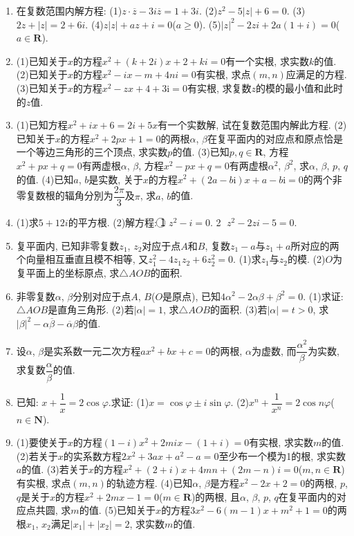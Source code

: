 \documentclass[10pt,a4paper]{article}
\begin{document}
\begin{enumerate}[1.]
\item 在复数范围内解方程:
(1)$z\cdot \overline z-3i\overline z=1+3i$.				(2)$z^2-5|z|+6=0$.
(3)$2z+|z|=2+6i$.					(4)$z|z|+az+i=0$($a\ge 0$).
(5)$|z|^2-2zi+2a(1+i)=0$($a\in \mathbf{R}$).
\item (1)已知关于$x$的方程$x^2+(k+2i)x+2+ki=0$有一个实根, 求实数$k$的值.
(2)已知关于$x$的方程$x^2-ix-m+4ni=0$有实根, 求点$(m,n)$应满足的方程.
(3)已知关于$x$的方程$x^2-zx+4+3\mathrm{i}=0$有实根, 求复数$z$的模的最小值和此时的$z$值.
\item (1)已知方程$x^2+ix+6=2i+5x$有一个实数解, 试在复数范围内解此方程.
(2)已知关于$x$的方程$x^2+2px+1=0$的两根$\alpha$, $\beta$在复平面内的对应点和原点恰是一个等边三角形的三个顶点, 求实数$p$的值.
(3)已知$p,q\in \mathbf{R}$, 方程$x^2+px+q=0$有两虚根$\alpha$, $\beta$, 方程$x^2-px+q=0$有两虚根$\alpha ^2$, $\beta ^2$, 求$\alpha$, $\beta$, $p$, $q$的值.
(4)已知$a$, $b$是实数, 关于$x$的方程$x^2+(2a-b\mathrm{i})x+a-b\mathrm{i}=0$的两个非零复数根的辐角分別为$\dfrac{2\pi }3$及$\pi$, 求$a$, $b$的值.
\item (1)求$5+12i$的平方根.
(2)解方程: \textcircled{1} $z^2-i=0$.				\textcircled{2} $z^2-2zi-5=0$.
\item 复平面内, 已知非零复数$z_1$, $z_2$对应于点$A$和$B$, 复数$z_1-a$与$z_1+a$所对应的两个向量相互垂直且模不相等, 又$z_1^2-4z_1z_2+6z_2^2=0$.
(1)求$z_1$与$z_2$的模.
(2)$O$为复平面上的坐标原点, 求$\triangle AOB$的面积.
\item 非零复数$\alpha$, $\beta$分别对应于点$A$, $B$($O$是原点), 已知$4\alpha ^2-2\alpha \beta +\beta ^2=0$.
(1)求证: $\triangle AOB$是直角三角形.
(2)若$|\alpha|=1$, 求$\triangle AOB$的面积.
(3)若$|\alpha|=t>0$, 求$|\beta|^2-\alpha \overline \beta -\overline \alpha \beta$的值.
\item 设$\alpha$, $\beta$是实系数一元二次方程$ax^2+bx+c=0$的两根, $\alpha$为虚数, 而$\dfrac{{{\alpha }^2}}{\beta }$为实数, 求复数$\dfrac{\alpha }{\beta }$的值.
\item 已知: $x+\dfrac 1x=2\cos \varphi$.求证:
(1)$x=\cos \varphi \pm i\sin \varphi$.
(2)$x^n+\dfrac 1{x^n}=2\cos n\varphi$($n\in \mathbf{N}$).
\item (1)要使关于$x$的方程$(1-i)x^2+2mix-(1+i)=0$有实根, 求实数$m$的值.
(2)若关于$x$的实系数方程$2x^2+3ax+a^2-a=0$至少布一个模为1的根, 求实数$a$的值.
(3)若关于$x$的方程$x^2+(2+i)x+4mn+(2m-n)i=0$($m,n\in \mathbf{R}$)有实根, 求点$(m,n)$的轨迹方程.
(4)已知$\alpha$, $\beta$是方程$x^2-2x+2=0$的两根, $p$, $q$是关于$x$的方程$x^2+2mx-1=0$($m\in \mathbf{R}$)的两根, 且$\alpha$, $\beta$, $p$, $q$在复平面内的对应点共圆, 求$m$的值.
(5)已知关于$x$的方程$3x^2-6(m-1)x+m^2+1=0$的两根$x_1$, $x_2$满足$|x_1|+|x_2|=2$, 求实数$m$的值.

\end{enumerate}
\end{document}
